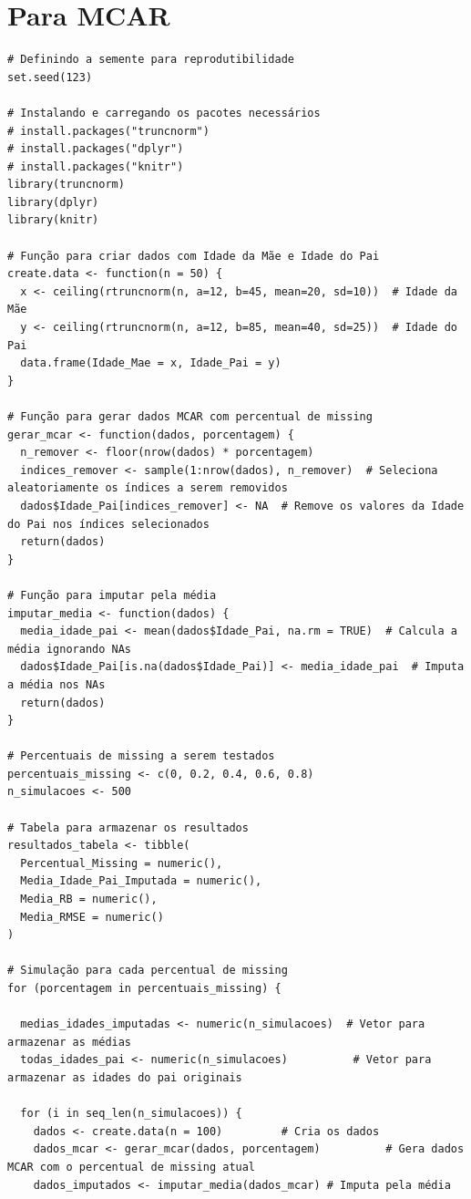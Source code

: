 \documentclass[11pt]{article}
\begin{document}
\section*{Para MCAR}
\begin{verbatim}
# Definindo a semente para reprodutibilidade
set.seed(123)

# Instalando e carregando os pacotes necessários
# install.packages("truncnorm")
# install.packages("dplyr")
# install.packages("knitr")
library(truncnorm)
library(dplyr)
library(knitr)

# Função para criar dados com Idade da Mãe e Idade do Pai
create.data <- function(n = 50) {
  x <- ceiling(rtruncnorm(n, a=12, b=45, mean=20, sd=10))  # Idade da Mãe
  y <- ceiling(rtruncnorm(n, a=12, b=85, mean=40, sd=25))  # Idade do Pai
  data.frame(Idade_Mae = x, Idade_Pai = y)
}

# Função para gerar dados MCAR com percentual de missing
gerar_mcar <- function(dados, porcentagem) {
  n_remover <- floor(nrow(dados) * porcentagem)
  indices_remover <- sample(1:nrow(dados), n_remover)  # Seleciona aleatoriamente os índices a serem removidos
  dados$Idade_Pai[indices_remover] <- NA  # Remove os valores da Idade do Pai nos índices selecionados
  return(dados)
}

# Função para imputar pela média
imputar_media <- function(dados) {
  media_idade_pai <- mean(dados$Idade_Pai, na.rm = TRUE)  # Calcula a média ignorando NAs
  dados$Idade_Pai[is.na(dados$Idade_Pai)] <- media_idade_pai  # Imputa a média nos NAs
  return(dados)
}

# Percentuais de missing a serem testados
percentuais_missing <- c(0, 0.2, 0.4, 0.6, 0.8)
n_simulacoes <- 500

# Tabela para armazenar os resultados
resultados_tabela <- tibble(
  Percentual_Missing = numeric(),
  Media_Idade_Pai_Imputada = numeric(),
  Media_RB = numeric(),
  Media_RMSE = numeric()
)

# Simulação para cada percentual de missing
for (porcentagem in percentuais_missing) {
  
  medias_idades_imputadas <- numeric(n_simulacoes)  # Vetor para armazenar as médias
  todas_idades_pai <- numeric(n_simulacoes)          # Vetor para armazenar as idades do pai originais
  
  for (i in seq_len(n_simulacoes)) {
    dados <- create.data(n = 100)         # Cria os dados
    dados_mcar <- gerar_mcar(dados, porcentagem)          # Gera dados MCAR com o percentual de missing atual
    dados_imputados <- imputar_media(dados_mcar) # Imputa pela média
    

\end{verbatim}
\end{document}
